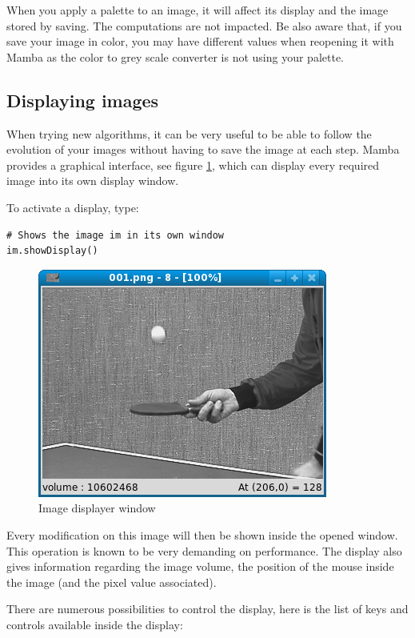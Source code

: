 \documentclass[a4paper,10pt,oneside]{article}
\begin{document}
When you apply a palette to an image, it will affect its display and the image 
stored by saving. The computations are not impacted. Be also aware that, if you 
save your image in color, you may have different values when reopening it with 
Mamba as the color to grey scale converter is not using your palette.

\subsection{Displaying images}
\label{cha:disp_im}

When trying new algorithms, it can be very useful to be able to follow the 
evolution of your images without having to save the image at each step. Mamba
provides a graphical interface, see figure \ref{fig:win}, which can display 
every required image into its own display window.

To activate a display, type:

\lstset{language=Python}
\begin{lstlisting}
# Shows the image im in its own window
im.showDisplay()
\end{lstlisting}

\begin{figure}
\centering
\includegraphics[scale=0.5]{mamba_win.png}
\caption{Image displayer window}
\label{fig:win}
\end{figure}

Every modification on this image will then be shown inside the opened window.
This operation is known to be very demanding on performance. The display also
gives information regarding the image volume, the position of the mouse inside
the image (and the pixel value associated).

There are numerous possibilities to control the display, here is the list of
keys and controls available inside the display:
\end{document}
